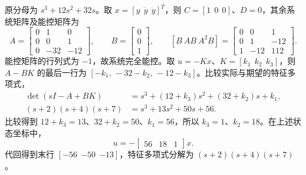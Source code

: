 
\sol 原分母为 $s^3+12s^2+32s$。取 $x=[y\ \ \dot y\ \ \ddot y]^T$，则 $C=[1\ \ 0\ \ 0]$、$D=0$，其余系统矩阵及能控矩阵为
\[
    A=\begin{bmatrix}0&1&0\\0&0&1\\0&-32&-12\end{bmatrix},\qquad
    B=\begin{bmatrix}0\\0\\1\end{bmatrix},\qquad
    [B\ AB\ A^2B]=\begin{bmatrix}
    0&0&1\\0&1&-12\\1&-12&112
    \end{bmatrix}.
\]
能控矩阵的行列式为 $-1$，故系统完全能控。取 $u=-Kx$、$K=[k_1\ \ k_2\ \ k_3]$，则 $A-BK$ 的最后一行为 $[-k_1,\,-32-k_2,\,-12-k_3]$。比较实际与期望的特征多项式，
\[
    \begin{aligned}
    \det(sI-A+BK)&=s^3+(12+k_3)s^2+(32+k_2)s+k_1,\\
    (s+2)(s+4)(s+7)&=s^3+13s^2+50s+56 .
    \end{aligned}
\]
比较得到 $12+k_3=13$、$32+k_2=50$、$k_1=56$，所以 $k_3=1$、$k_2=18$。在上述状态坐标中，
\[
    \boxed{u=-\begin{bmatrix}56&18&1\end{bmatrix}x.}
\]
代回得到末行 $[-56\ \ {-50}\ \ {-13}]$，特征多项式分解为 $(s+2)(s+4)(s+7)$。



